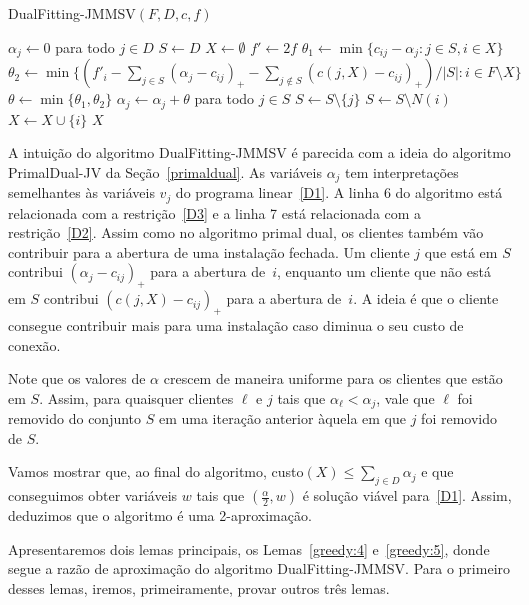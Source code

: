 \begin{algorithm}
    \caption{\sc DualFitting-JMMSV$(F,D,c,f)$}
    \begin{algorithmic}[1]
    \State $\alpha_j \gets 0$ para todo $j \in D$
    \State $S \gets D$
    \State $X \gets \emptyset$
    \State $f' \gets 2f$
    \State $\theta_1 \gets \min\{c_{ij} - \alpha_j:j \in S,i\in X\}$
    \State $\theta_2 \gets \min\{(f'_i - \sum_{j \in S}(\alpha_j - c_{ij})_+ - \sum_{j \not \in S}(c(j,X) - c_{ij})_+)/|S|: i \in F \setminus X\}$
    \State $\theta \gets \min\{\theta_1,\theta_2\}$
    \State $\alpha_j \gets \alpha_j + \theta$ para todo $j \in S$
    \State $S \gets S \setminus \{j\}$
    \EndIf
    \State $S \gets S\setminus N(i)$
    \State $X \gets X \cup \{i\}$
    \EndIf
    \EndWhile
    \State \Return $X$
    \end{algorithmic}
\end{algorithm}

A intuição do algoritmo {\sc DualFitting-JMMSV} é parecida com a ideia do algoritmo {\sc PrimalDual-JV} da Seção~\ref{primaldual}. As variáveis $\alpha_j$ tem interpretações semelhantes às variáveis $v_j$ do programa linear~\eqref{D1}. A linha 6 do algoritmo está relacionada com a restrição~\eqref{D3} e a linha 7 está relacionada com a restrição~\eqref{D2}. Assim como no algoritmo primal dual, os clientes também vão contribuir para a abertura de uma instalação fechada. Um cliente $j$ que está em $S$ contribui $(\alpha_j - c_{ij})_+$ para a abertura de~$i$, enquanto um cliente que não está em $S$ contribui $(c(j,X) - c_{ij})_+$ para a abertura de~$i$. A ideia é que o cliente consegue contribuir mais para uma instalação caso diminua o seu custo de conexão.

Note que os valores de $\alpha$ crescem de maneira uniforme para os clientes que estão em $S$. Assim, para quaisquer clientes $\ell$ e $j$ tais que $\alpha_\ell < \alpha_j$, vale que $\ell$ foi removido do conjunto $S$ em uma iteração anterior àquela em que $j$ foi removido de $S$.

Vamos mostrar que, ao final do algoritmo, custo$(X)\leq \sum_{j \in D} \alpha_j$ e que conseguimos obter variáveis $w$ tais que $(\frac{\alpha}{2},w)$ é solução viável para~\eqref{D1}. 
Assim, deduzimos que o algoritmo é uma 2-aproximação.


Apresentaremos dois lemas principais, os Lemas~\ref{greedy:4} e~\ref{greedy:5}, donde segue a razão de aproximação do algoritmo {\sc DualFitting-JMMSV}.
Para o primeiro desses lemas, iremos, primeiramente, provar outros três lemas.

